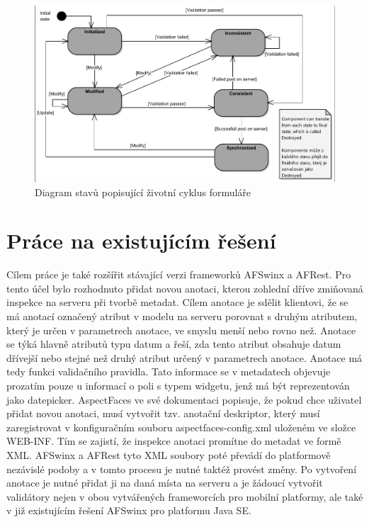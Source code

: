 \begin{figure}[h!]
\centering
\includegraphics[width=0.87\linewidth, trim=1 1 1 1, clip]{figures/stateDiagram}
\caption{Diagram stavů popisující životní cyklus formuláře}
\label{img:formStateDiagram}
\end{figure}

\section{Práce na existujícím řešení}
Cílem práce je také rozšířit stávající verzi frameworků AFSwinx a AFRest. Pro tento účel bylo rozhodnuto přidat novou anotaci, kterou zohlední dříve zmiňovaná inspekce na serveru při tvorbě metadat. Cílem anotace je sdělit klientovi, že se má anotací označený atribut v modelu na serveru porovnat s druhým atributem, který je určen v parametrech anotace, ve smyslu menší nebo rovno než. Anotace se týká hlavně atributů typu datum a řeší, zda tento atribut obsahuje datum dřívejší nebo stejné než druhý atribut určený v parametrech anotace. Anotace má tedy funkci validačního pravidla. Tato informace se v metadatech objevuje prozatím pouze u informací o poli s typem widgetu, jenž má být reprezentován jako datepicker. AspectFaces \cite{aspect-faces} ve své dokumentaci popisuje, že pokud chce uživatel přidat novou anotaci, musí vytvořit tzv. anotační deskriptor, který musí zaregistrovat v konfiguračním souboru aspectfaces-config.xml uloženém ve složce WEB-INF. Tím se zajistí, že inspekce anotaci promítne do metadat ve formě XML. AFSwinx a AFRest tyto XML soubory poté převádí do platformově nezávislé podoby \cite{tomasek-thesis} a v tomto procesu je nutné taktéž provést změny. Po vytvoření anotace je nutné přidat ji na daná místa na serveru a je žádoucí vytvořit validátory nejen v obou vytvářených frameworcích pro mobilní platformy, ale také v již existujícím řešení AFSwinx pro platformu Java SE.

